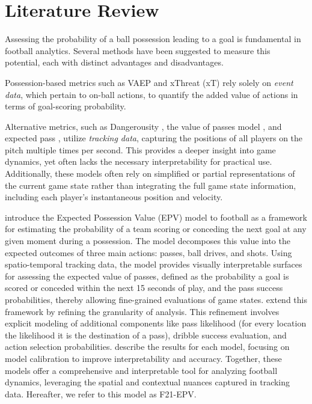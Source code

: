 \section{Literature Review}
\label{literature_review}

Assessing the probability of a ball possession leading to a goal is fundamental in football analytics. Several methods have been suggested to measure this potential, each with distinct advantages and disadvantages.

Possession-based metrics such as VAEP \citep{VAEP2019} and xThreat (xT) \citep{singh} rely solely on \textit{event data}, which pertain to on-ball actions, to quantify the added value of actions in terms of goal-scoring probability.

Alternative metrics, such as Dangerousity \citep{Link2016}, the value of passes model \citep{Power2017}, and expected pass \citep{anzer2022expected}, utilize \textit{tracking data}, capturing the positions of all players on the pitch multiple times per second. This provides a deeper insight into game dynamics, yet often lacks the necessary interpretability for practical use. Additionally, these models often rely on simplified or partial representations of the current game state rather than integrating the full game state information, including each player's instantaneous position and velocity.

\cite{fernandez2019decomposing} introduce the Expected Possession Value (EPV) model to football as a framework for estimating the probability of a team scoring or conceding the next goal at any given moment during a possession. The model decomposes this value into the expected outcomes of three main actions: passes, ball drives, and shots. Using spatio-temporal tracking data, the model provides visually interpretable surfaces for assessing the expected value of passes, defined as the probability a goal is scored or conceded within the next 15 seconds of play, and the pass success probabilities, thereby allowing fine-grained evaluations of game states. \cite{Fernández2021} extend this framework by refining the granularity of analysis. This refinement involves explicit modeling of additional components like pass likelihood (for every location the likelihood it is the destination of a pass), dribble success evaluation, and action selection probabilities. \cite{Fernández2021} describe the results for each model, focusing on model calibration to improve interpretability and accuracy. Together, these models offer a comprehensive and interpretable tool for analyzing football dynamics, leveraging the spatial and contextual nuances captured in tracking data. Hereafter, we refer to this model as F21-EPV.

